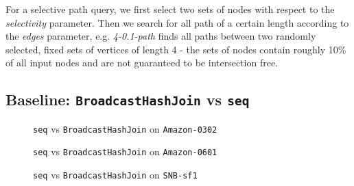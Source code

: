 For a selective path query, we first select two sets of nodes with respect to the \textit{selectivity} parameter.
Then we search for all path of a certain length according to the \textit{edges} parameter, e.g. \textit{4-0.1-path} finds all
paths between two randomly selected, fixed sets of vertices of length 4 - the sets of nodes contain roughly 10\% of all input nodes and are not guaranteed to be intersection free.

\subsection{Baseline: \texttt{BroadcastHashJoin} vs \texttt{seq}}

\begin{figure}
    \centering
    
    \caption{\texttt{seq} vs \texttt{BroadcastHashJoin} on \texttt{Amazon-0302}}
    \label{fig:seq-bar-ama-0302}
\end{figure}

\begin{figure}
    \centering
    
    \caption{\texttt{seq} vs \texttt{BroadcastHashJoin} on \texttt{Amazon-0601}}
    \label{fig:seq-bar-ama-0601}
\end{figure}

\begin{figure}
    \centering
    
    \caption{\texttt{seq} vs \texttt{BroadcastHashJoin} on \texttt{SNB-sf1}}
    \label{fig:seq-bar-snb-sf1}
\end{figure}









